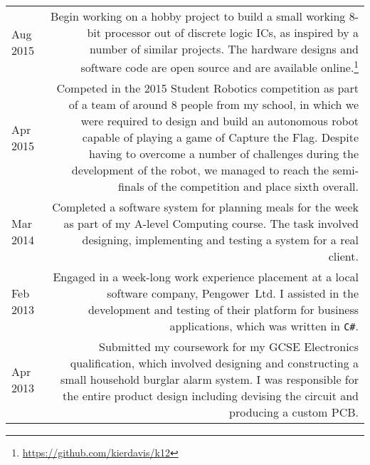 
\vspace{-1.2em}

\begin{longtable}{L!{\sep}R}
    Aug 2015 &
    Begin working on a hobby project to build a small working 8-bit processor out of discrete logic ICs, as inspired by a number of similar projects. The hardware designs and software code are open source and are available online.\footnote{\url{https://github.com/kierdavis/k12}}
    \vspace{1.2em} \\

    Apr 2015 &
    Competed in the 2015 Student Robotics competition as part of a team of around 8 people from my school, in which we were required to design and build an autonomous robot capable of playing a game of Capture the Flag. Despite having to overcome a number of challenges during the development of the robot, we managed to reach the semi-finals of the competition and place sixth overall.
    \vspace{1.2em} \\

    Mar 2014 &
    Completed a software system for planning meals for the week as part of my A-level Computing course. The task involved designing, implementing and testing a system for a real client.
    \vspace{1.2em} \\


    Feb 2013 &
    Engaged in a week-long work experience placement at a local software company, \mbox{Pengower Ltd}. I assisted in the development and testing of their platform for business applications, which was written in \texttt{C\#}.
    \vspace{1.2em} \\

    Apr 2013 &
    Submitted my coursework for my GCSE Electronics qualification, which involved designing and constructing a small household burglar alarm system. I was responsible for the entire product design including devising the circuit and producing a custom PCB.
    \vspace{1.2em} \\


\end{longtable}

